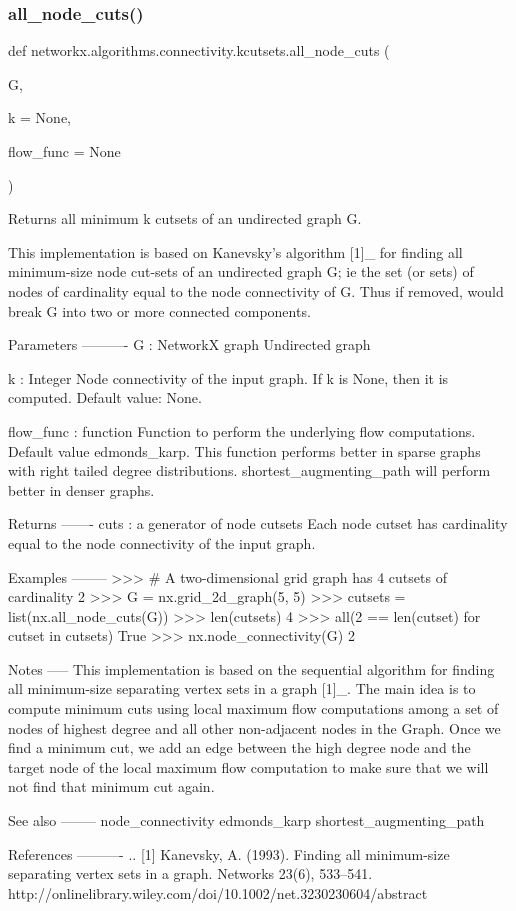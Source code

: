 \subsubsection{\texorpdfstring{all\+\_\+node\+\_\+cuts()}{all\_node\_cuts()}}
{\footnotesize\ttfamily def networkx.\+algorithms.\+connectivity.\+kcutsets.\+all\+\_\+node\+\_\+cuts (\begin{DoxyParamCaption}\item[{}]{G,  }\item[{}]{k = {\ttfamily None},  }\item[{}]{flow\+\_\+func = {\ttfamily None} }\end{DoxyParamCaption})}

\begin{DoxyVerb}Returns all minimum k cutsets of an undirected graph G.

This implementation is based on Kanevsky's algorithm [1]_ for finding all
minimum-size node cut-sets of an undirected graph G; ie the set (or sets)
of nodes of cardinality equal to the node connectivity of G. Thus if
removed, would break G into two or more connected components.

Parameters
----------
G : NetworkX graph
    Undirected graph

k : Integer
    Node connectivity of the input graph. If k is None, then it is
    computed. Default value: None.

flow_func : function
    Function to perform the underlying flow computations. Default value
    edmonds_karp. This function performs better in sparse graphs with
    right tailed degree distributions. shortest_augmenting_path will
    perform better in denser graphs.


Returns
-------
cuts : a generator of node cutsets
    Each node cutset has cardinality equal to the node connectivity of
    the input graph.

Examples
--------
>>> # A two-dimensional grid graph has 4 cutsets of cardinality 2
>>> G = nx.grid_2d_graph(5, 5)
>>> cutsets = list(nx.all_node_cuts(G))
>>> len(cutsets)
4
>>> all(2 == len(cutset) for cutset in cutsets)
True
>>> nx.node_connectivity(G)
2

Notes
-----
This implementation is based on the sequential algorithm for finding all
minimum-size separating vertex sets in a graph [1]_. The main idea is to
compute minimum cuts using local maximum flow computations among a set
of nodes of highest degree and all other non-adjacent nodes in the Graph.
Once we find a minimum cut, we add an edge between the high degree
node and the target node of the local maximum flow computation to make
sure that we will not find that minimum cut again.

See also
--------
node_connectivity
edmonds_karp
shortest_augmenting_path

References
----------
.. [1]  Kanevsky, A. (1993). Finding all minimum-size separating vertex
        sets in a graph. Networks 23(6), 533--541.
        http://onlinelibrary.wiley.com/doi/10.1002/net.3230230604/abstract\end{DoxyVerb}
 

